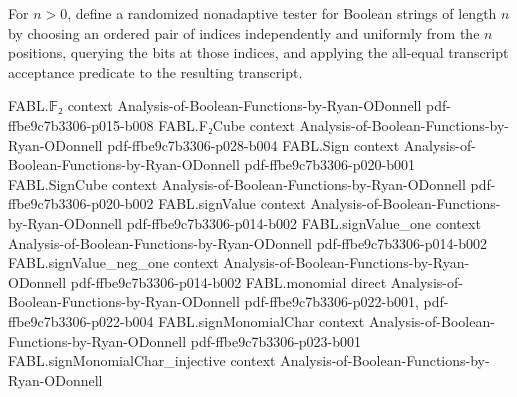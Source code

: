 \begin{definition}
\label{FABL.allEqualStringTester}
\leanok
{}
For $n>0$, define a randomized nonadaptive tester for Boolean strings of length $n$ by
choosing an ordered pair of indices independently and uniformly from the $n$ positions,
querying the bits at those indices, and applying the all-equal transcript acceptance
predicate to the resulting transcript.
\end{definition}

\begin{theorem}
\label{FABL.allEqualStringTester_rejectionProbability}
\leanok
{}
\proofstep
  {FABL.𝔽₂}
  {context}
  {Analysis-of-Boolean-Functions-by-Ryan-ODonnell}
  {pdf-ffbe9c7b3306-p015-b008}
\proofstep
  {FABL.F₂Cube}
  {context}
  {Analysis-of-Boolean-Functions-by-Ryan-ODonnell}
  {pdf-ffbe9c7b3306-p028-b004}
\proofstep
  {FABL.Sign}
  {context}
  {Analysis-of-Boolean-Functions-by-Ryan-ODonnell}
  {pdf-ffbe9c7b3306-p020-b001}
\proofstep
  {FABL.SignCube}
  {context}
  {Analysis-of-Boolean-Functions-by-Ryan-ODonnell}
  {pdf-ffbe9c7b3306-p020-b002}
\proofstep
  {FABL.signValue}
  {context}
  {Analysis-of-Boolean-Functions-by-Ryan-ODonnell}
  {pdf-ffbe9c7b3306-p014-b002}
\proofstep
  {FABL.signValue_one}
  {context}
  {Analysis-of-Boolean-Functions-by-Ryan-ODonnell}
  {pdf-ffbe9c7b3306-p014-b002}
\proofstep
  {FABL.signValue_neg_one}
  {context}
  {Analysis-of-Boolean-Functions-by-Ryan-ODonnell}
  {pdf-ffbe9c7b3306-p014-b002}
\proofstep
  {FABL.monomial}
  {direct}
  {Analysis-of-Boolean-Functions-by-Ryan-ODonnell}
  {pdf-ffbe9c7b3306-p022-b001,
    pdf-ffbe9c7b3306-p022-b004}
\proofstep
  {FABL.signMonomialChar}
  {context}
  {Analysis-of-Boolean-Functions-by-Ryan-ODonnell}
  {pdf-ffbe9c7b3306-p023-b001}
\proofstep
  {FABL.signMonomialChar_injective}
  {context}
  {Analysis-of-Boolean-Functions-by-Ryan-ODonnell}

\end{theorem}
